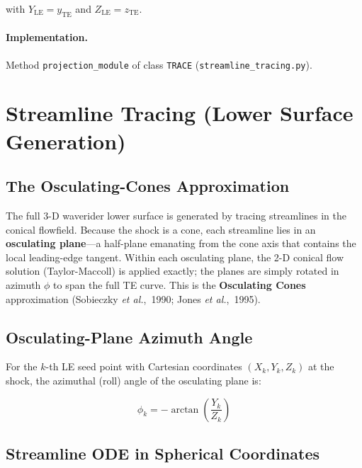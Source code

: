 \documentclass[12pt,a4paper]{article}
\begin{document}
with $Y_{\mathrm{LE}} = y_{\mathrm{TE}}$ and $Z_{\mathrm{LE}} = z_{\mathrm{TE}}$.

\paragraph{Implementation.}
Method \texttt{projection\_module} of class \texttt{TRACE}
(\texttt{streamline\_tracing.py}).

\section{Streamline Tracing (Lower Surface Generation)}
\label{sec:streamline}

\subsection{The Osculating-Cones Approximation}

The full 3-D waverider lower surface is generated by tracing streamlines in
the conical flowfield.  Because the shock is a cone, each streamline lies in
an \textbf{osculating plane}---a half-plane emanating from the cone axis that
contains the local leading-edge tangent.  Within each osculating plane, the
2-D conical flow solution (Taylor-Maccoll) is applied exactly; the planes are
simply rotated in azimuth $\phi$ to span the full TE curve.  This is the
\textbf{Osculating Cones} approximation (Sobieczky \textit{et al.},~1990;
Jones \textit{et al.},~1995).

\subsection{Osculating-Plane Azimuth Angle}

For the $k$-th LE seed point with Cartesian coordinates
$(X_k, Y_k, Z_k)$ at the shock, the azimuthal (roll) angle of the
osculating plane is:

\begin{equation}
    \phi_k = -\arctan\!\left(\frac{Y_k}{Z_k}\right)
    \label{eq:phi}
\end{equation}

\subsection{Streamline ODE in Spherical Coordinates}
\end{document}

